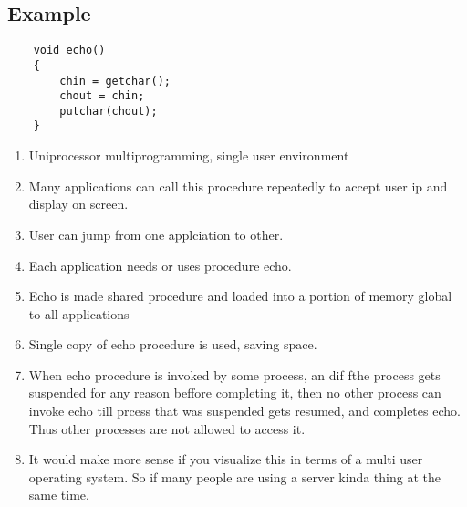 \documentclass[11pt]{article}
\begin{document}
\subsection{Example}

\begin{verbatim}
    void echo()
    {
        chin = getchar();
        chout = chin;
        putchar(chout);
    }
\end{verbatim}

\begin{enumerate}
    \item Uniprocessor multiprogramming, single user environment
    \item Many applications can call this procedure repeatedly to accept user ip and display on screen. 
    \item User can jump from one applciation to other. 
    \item Each application needs or uses procedure echo. 
    \item Echo is made shared procedure and loaded into a portion of memory global to all applications 
    \item Single copy of echo procedure is used, saving space. 
    \item When echo procedure is invoked by some process, an dif fthe process gets suspended for any reason beffore completing it, then no other process can invoke echo till prcess that was suspended gets resumed, and completes echo. Thus other processes are not allowed to access it. 
    \item It would make more sense if you visualize this in terms of a multi user operating system. So if many people are using a server kinda thing at the same time.
\end{enumerate}
\end{document}
